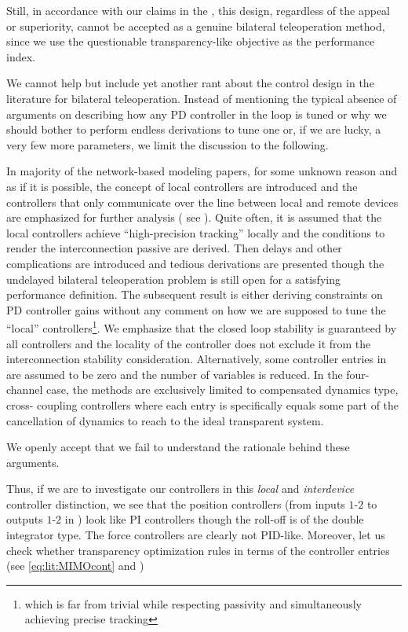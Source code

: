 Still, in accordance with our claims in the , this design, regardless of the appeal or superiority, cannot be accepted as 
a genuine bilateral teleoperation method, since we use the questionable transparency-like objective as the performance index.

We cannot help but include yet another rant about the control design in the literature for bilateral teleoperation. Instead of mentioning 
the typical absence of arguments on describing how any PD controller in the loop is tuned or why we should bother to perform endless 
derivations to tune one or, if we are lucky, a very few more parameters, we limit the discussion to the following. 

In majority of the network-based modeling papers, for some unknown reason and as if it is possible, the concept of local controllers are 
introduced and the controllers that only communicate over the line between local and remote devices are emphasized for further analysis (%
see ). Quite often, it is assumed that the local controllers achieve \enquote{high-precision tracking} locally and the 
conditions to render the interconnection passive are derived. Then delays and other complications are introduced and tedious derivations 
are presented though the undelayed bilateral teleoperation problem is still open for a satisfying performance definition. The subsequent 
result is either deriving constraints on PD controller gains without any comment on how we are supposed to tune the \enquote{local} 
controllers\footnote{which is far from trivial while respecting passivity and simultaneously achieving precise tracking}. We emphasize 
that the closed loop stability is guaranteed by all controllers and the locality of the controller does not exclude it from the 
interconnection stability consideration. Alternatively, some controller entries in  are assumed to be zero and the 
number of variables is reduced. In the four-channel case, the methods are exclusively limited to compensated dynamics type, cross-
coupling controllers where each entry is specifically equals some part of the cancellation of dynamics to reach to the ideal transparent 
system. 

We openly accept that we fail to understand the rationale behind these arguments.

Thus, if we are to investigate our controllers in this \emph{local} and \emph{interdevice} controller distinction, we see that the 
position controllers (from inputs $1$-$2$ to outputs $1$-$2$ in ) look like PI controllers though the roll-off 
is of the double integrator type. The force controllers are clearly not PID-like. Moreover, let us check whether transparency 
optimization rules in terms of the controller entries (see \eqref{eq:lit:MIMOcont} and )

